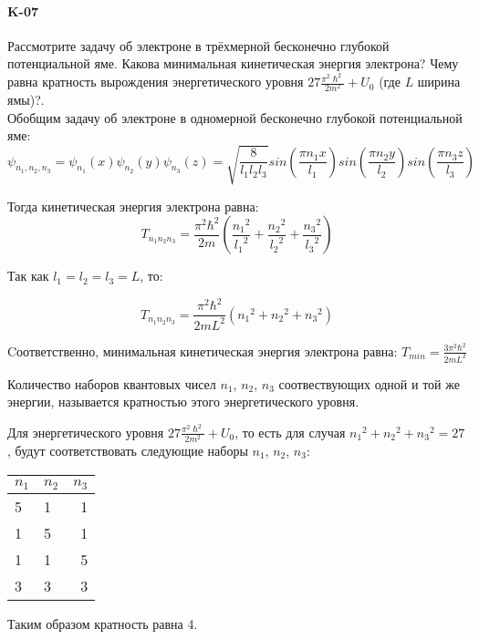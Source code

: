 \documentclass[__main__.tex]{subfiles}
\begin{document}
\paragraph{K-07}
Рассмотрите задачу об электроне в трёхмерной бесконечно глубокой потенциальной яме. Какова минимальная кинетическая энергия электрона? Чему равна кратность вырождения энергетического уровня $ 27 \frac{\pi^2\hslash^2}{2m^2}+U_0$ (где $L$ ширина ямы)?.\\

Обобщим задачу об электроне в одномерной бесконечно глубокой потенциальной яме:\\

$$\psi_{{n_1},{n_2},{n_3}}=\psi_{n_1}(x)\psi_{n_2}(y)\psi_{n_3}(z) = \sqrt{\frac{8}{l_1 l_2 l_3}}sin\left(\frac{\pi n_1 x}{l_1}\right)sin\left(\frac{\pi n_2 y}{l_2}\right)sin\left(\frac{\pi n_3 z}{l_3}\right)$$

Тогда кинетическая энергия электрона равна:
$$T_{n_1 n_2 n_3} = \frac{\pi^2\hbar^2}{2m}\left(\frac{{n_1}^2}{{l_1}^2}+\frac{{n_2}^2}{{l_2}^2}+\frac{{n_3}^2}{{l_3}^2}\right)$$

Так как $l_1 = l_2 = l_3 = L$, то: 

$$T_{n_1 n_2 n_3} =  \frac{\pi^2\hbar^2}{2m L^2}\left({n_1}^2+{n_2}^2+{n_3}^2\right)$$

Cоответственно, минимальная кинетическая энергия электрона равна: $T_{min} =   \frac{3\pi^2\hbar^2}{2m L^2}$\\

\begin {definition}
Количество наборов квантовых чисел $n_1$, $n_2$, $n_3$ соотвествующих одной и той же энергии, называется кратностью этого энергетического уровня.
\end {definition}

Для энергетического уровня $ 27 \frac{\pi^2\hslash^2}{2m^2}+U_0$, то есть для случая ${n_1}^2+{n_2}^2+{n_3}^2 = 27$ , будут соответствовать следующие наборы  $n_1$, $n_2$, $n_3$:

\begin {table}[h]
\centering
\begin {tabular}{llr}
\toprule
$n_1$ & $n_2$ & $n_3$ \\
\midrule
5 & 1 & 1 \\
1 & 5 & 1 \\
1 & 1 & 5 \\
3 & 3 & 3 \\
\bottomrule
\end {tabular}
\end {table}

Таким образом кратность равна 4.
\end{document}
